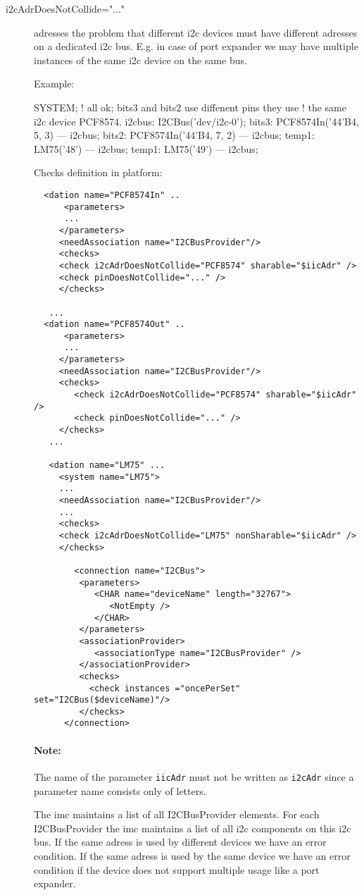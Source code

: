 \begin{description}
\item[i2cAdrDoesNotCollide="..."] adresses the problem that 
  different i2c devices must have different adresses on a dedicated
  i2c bus. E.g. in case of port expander we may have multiple
  instances of the same i2c device on the same bus.

  Example: 

  \begin{PEARLCode}
  SYSTEM;
    ! all ok; bits3 and bits2 use diffenent pins they use
    ! the same i2c device PCF8574.
    i2cbus: I2CBus('dev/i2c-0');
    bits3: PCF8574In('44'B4, 5, 3) --- i2cbus;
    bits2: PCF8574In('44'B4, 7, 2) --- i2cbus;
    temp1: LM75('48') --- i2cbus;
    temp1: LM75('49') --- i2cbus;
  \end{PEARLCode}

  Checks definition in platform:

  \begin{verbatim}
  <dation name="PCF8574In" ..
      <parameters>
      ...
     </parameters>
     <needAssociation name="I2CBusProvider"/>
     <checks>
     <check i2cAdrDoesNotCollide="PCF8574" sharable="$iicAdr" />
     <check pinDoesNotCollide="..." />
     </checks>

   ...
  <dation name="PCF8574Out" ..
      <parameters>
      ...
     </parameters>
     <needAssociation name="I2CBusProvider"/>
     <checks>
        <check i2cAdrDoesNotCollide="PCF8574" sharable="$iicAdr" />
        <check pinDoesNotCollide="..." />
     </checks>
   ...

   <dation name="LM75" ...
     <system name="LM75">
     ...
     <needAssociation name="I2CBusProvider"/>
     ...
     <checks>
     <check i2cAdrDoesNotCollide="LM75" nonSharable="$iicAdr" />
     </checks>

        <connection name="I2CBus">
         <parameters>
            <CHAR name="deviceName" length="32767">
               <NotEmpty />
            </CHAR>
         </parameters>
         <associationProvider>
            <associationType name="I2CBusProvider" />
         </associationProvider>
         <checks>
           <check instances ="oncePerSet" set="I2CBus($deviceName)"/>
         </checks>
      </connection>

  \end{verbatim}

  \paragraph{Note:} The name of the parameter \verb|iicAdr| must not be written
  as \verb|i2cAdr| since a parameter name consists only of letters.

  The imc maintains a list of all I2CBusProvider elements.
  For each I2CBusProvider the imc maintains a list of all  i2c components
  on this i2c bus.
  If the same  adress is used by different devices we have an error condition.
  If the same  adress is used by the same device we have an error condition if
  the device does not support multiple usage like a port expander.
\end{description}

